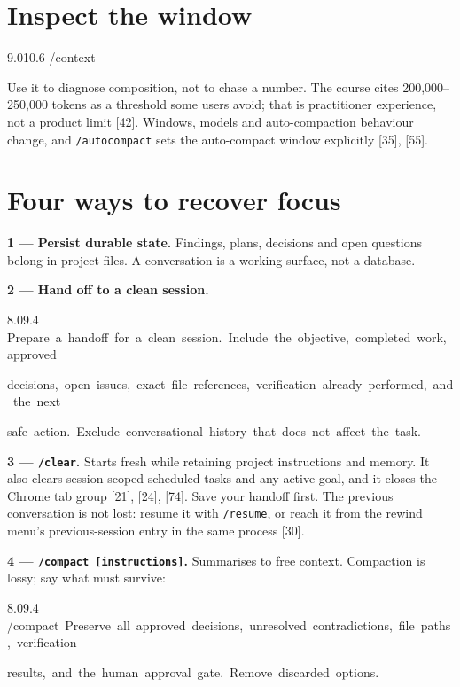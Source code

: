 \documentclass[11pt,a4paper,twoside,openany]{book}
\newcommand{\cl}[1]{\noindent\mbox{#1}\par}
\begin{document}
\FloatBarrier
\setcounter{section}{0}
\section{Inspect the window}

\begin{codeblock}{9.0}{10.6}
\cl{/context}
\end{codeblock}

Use it to diagnose composition, not to chase a number. The course cites 200,000–250,000 tokens as a threshold some users avoid; that is practitioner experience, not a product limit [42]. Windows, models and auto-compaction behaviour change, and \texttt{/\allowbreak{}autocompact} sets the auto-compact window explicitly [35], [55].


\FloatBarrier
\setcounter{section}{1}
\section{Four ways to recover focus}

\textbf{1 — Persist durable state.} Findings, plans, decisions and open questions belong in project files. A conversation is a working surface, not a database.


\textbf{2 — Hand off to a clean session.}


\begin{codeblock}{8.0}{9.4}
\cl{Prepare~a~handoff~for~a~clean~session.~Include~the~objective,~completed~work,~approved}
\cl{decisions,~open~issues,~exact~file~references,~verification~already~performed,~and~the~next}
\cl{safe~action.~Exclude~conversational~history~that~does~not~affect~the~task.}
\end{codeblock}

\textbf{3 — \texttt{/\allowbreak{}clear}.} Starts fresh while retaining project instructions and memory. It also clears session-scoped scheduled tasks and any active goal, and it closes the Chrome tab group [21], [24], [74]. Save your handoff first. The previous conversation is not lost: resume it with \texttt{/\allowbreak{}resume}, or reach it from the rewind menu's previous-session entry in the same process [30].


\textbf{4 — \texttt{/\allowbreak{}compact [in\allowbreak{}structions]}.} Summarises to free context. Compaction is lossy; say what must survive:


\begin{codeblock}{8.0}{9.4}
\cl{/compact~Preserve~all~approved~decisions,~unresolved~contradictions,~file~paths,~verification}
\cl{results,~and~the~human~approval~gate.~Remove~discarded~options.}
\end{codeblock}
\end{document}
